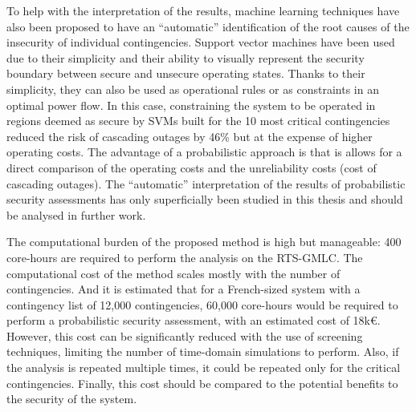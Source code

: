 To help with the interpretation of the results, machine learning techniques have also been proposed to have an ``automatic'' identification of the root causes of the insecurity of individual contingencies. Support vector machines have been used due to their simplicity and their ability to visually represent the security boundary between secure and unsecure operating states. Thanks to their simplicity, they can also be used as operational rules or as constraints in an optimal power flow. In this case, constraining the system to be operated in regions deemed as secure by SVMs built for the 10 most critical contingencies reduced the risk of cascading outages by 46\% but at the expense of higher operating costs. The advantage of a probabilistic approach is that is allows for a direct comparison of the operating costs and the unreliability costs (\ie cost of cascading outages). The ``automatic'' interpretation of the results of probabilistic security assessments has only superficially been studied in this thesis and should be analysed in further work.

The computational burden of the proposed method is high but manageable: 400 core-hours are required to perform the analysis on the RTS-GMLC. The computational cost of the method scales mostly with the number of contingencies. And it is estimated that for a French-sized system with a contingency list of 12,000 contingencies, 60,000 core-hours would be required to perform a probabilistic security assessment, with an estimated cost of 18k€. However, this cost can be significantly reduced with the use of screening techniques, limiting the number of time-domain simulations to perform. Also, if the analysis is repeated multiple times, it could be repeated only for the critical contingencies. Finally, this cost should be compared to the potential benefits to the security of the system.
